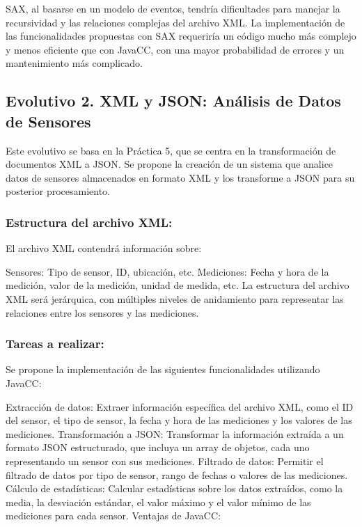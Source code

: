 SAX, al basarse en un modelo de eventos, tendría dificultades para manejar la recursividad y las relaciones complejas del archivo XML. La implementación de las funcionalidades propuestas con SAX requeriría un código mucho más complejo y menos eficiente que con JavaCC, con una mayor probabilidad de errores y un mantenimiento más complicado.

\subsection{Evolutivo 2. XML y JSON: Análisis de Datos de Sensores}

Este evolutivo se basa en la Práctica 5, que se centra en la transformación de documentos XML a JSON. Se propone la creación de un sistema que analice datos de sensores almacenados en formato XML y los transforme a JSON para su posterior procesamiento.

\subsubsection*{Estructura del archivo XML:}

El archivo XML contendrá información sobre:

Sensores: Tipo de sensor, ID, ubicación, etc.
Mediciones: Fecha y hora de la medición, valor de la medición, unidad de medida, etc.
La estructura del archivo XML será jerárquica, con múltiples niveles de anidamiento para representar las relaciones entre los sensores y las mediciones.

\subsubsection*{Tareas a realizar:}

Se propone la implementación de las siguientes funcionalidades utilizando JavaCC:

Extracción de datos: Extraer información específica del archivo XML, como el ID del sensor, el tipo de sensor, la fecha y hora de las mediciones y los valores de las mediciones.
Transformación a JSON: Transformar la información extraída a un formato JSON estructurado, que incluya un array de objetos, cada uno representando un sensor con sus mediciones.
Filtrado de datos: Permitir el filtrado de datos por tipo de sensor, rango de fechas o valores de las mediciones.
Cálculo de estadísticas: Calcular estadísticas sobre los datos extraídos, como la media, la desviación estándar, el valor máximo y el valor mínimo de las mediciones para cada sensor.
Ventajas de JavaCC:

